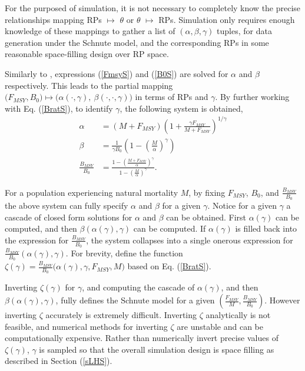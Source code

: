 \documentclass[12pt]{article}
\begin{document}
%
For the purposed of simulation, it is not necessary to completely know 
the precise relationships mapping RPs $\mapsto$ $\theta$ or $\theta$ $\mapsto$ 
RPs. Simulation only requires enough knowledge of these mappings to gather a list 
of $(\alpha, \beta, \gamma)$ tuples, for data generation under the Schnute model, 
and the corresponding RPs in some reasonable space-filling design over RP space. 

%
Similarly to , expressions %
(\ref{FmsyS}) and (\ref{B0S}) are solved for $\alpha$ and $\beta$ respectively. 
This leads to the partial mapping 
$\big(F_{MSY}, B_0\big) \mapsto \big(\alpha(\cdot, \gamma), ~\beta(\cdot, \cdot, \gamma)\big)$ 
in terms of RPs and $\gamma$. 
By further working with Eq. (\ref{BratS}), to identify $\gamma$, the following 
system is obtained,
%
\begin{align}
\alpha &= (M+F_{MSY})\left(1+\frac{\gamma F_{MSY}}{M+F_{MSY}}\right)^{1/\gamma} \nonumber\\
\beta &= \frac{1}{\gamma B_0}\left(1-\left(\frac{M}{\alpha}\right)^\gamma\right) \label{abgSys}\\
\frac{B_{MSY}}{B_0} &= \frac{1-\left(\frac{M+F_{MSY}}{\alpha}\right)^\gamma}{ 1-\left(\frac{M}{\alpha}\right)^\gamma } \nonumber.
\end{align}

%
For a population experiencing natural mortality $M$, by fixing $F_{MSY}$, 
$B_0$, and $\frac{B_{MSY}}{B_0}$ %
the above system can fully specify $\alpha$ and $\beta$ for a given $\gamma$. %
Notice for a given $\gamma$ a cascade of closed form solutions for $\alpha$ 
and $\beta$ can be obtained. First $\alpha(\gamma)$ can be computed, and then 
$\beta(\alpha(\gamma), \gamma)$ can be computed. If $\alpha(\gamma)$ is filled 
back into the expression for $\frac{B_{MSY}}{B_0}$, the system collapses into 
a single onerous expression for $\frac{B_{MSY}}{B_0}(\alpha(\gamma), \gamma)$. 
For brevity, define the function \mbox{$\zeta(\gamma)=\frac{B_{MSY}}{B_0}\big(\alpha(\gamma), \gamma, F_{MSY}, M\big)$} based on Eq. (\ref{BratS}). 

Inverting $\zeta(\gamma)$ for $\gamma$, and computing the cascade of 
$\alpha(\gamma)$, and then $\beta(\alpha(\gamma), \gamma)$, fully defines the 
Schnute model for a given $(\frac{F_{MSY}}{M}, \frac{B_{MSY}}{B_0})$. However
inverting $\zeta$ accurately is extremely difficult. Inverting $\zeta$ 
analytically is not feasible, and numerical methods for inverting 
$\zeta$ are unstable and can be computationally expensive. 
%
Rather than numerically invert precise values of $\zeta(\gamma)$, $\gamma$ is 
sampled so that the overall simulation design is space filling as described in 
Section (\ref{sLHS}).
\end{document}
